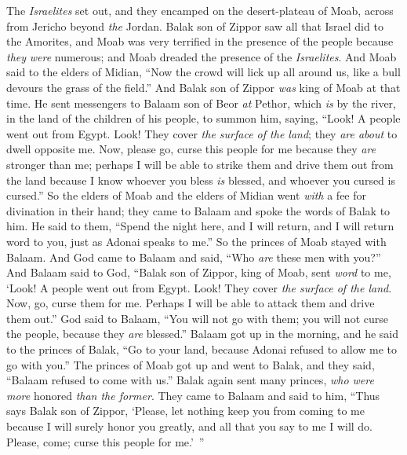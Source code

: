 \begin{biblechapter} %
 The \textit{Israelites} set out, and they encamped on the desert-plateau of Moab, across from Jericho beyond \textit{the} Jordan.
\verse Balak son of Zippor saw all that Israel did to the Amorites,
\verse and Moab was very terrified in the presence of the people because \textit{they} \textit{were} numerous; and Moab dreaded the presence of the \textit{Israelites}.
\verse And Moab said to the elders of Midian, “Now the crowd will lick up all around us, like a bull devours the grass of the field.” And Balak son of Zippor \textit{was} king of Moab at that time.
\verse He sent messengers to Balaam son of Beor \textit{at} Pethor, which \textit{is} by the river, in the land of the children of his people, to summon him, saying, “Look! A people went out from Egypt. Look! They cover \textit{the surface of the land}; they \textit{are about} to dwell opposite me.
\verse Now, please go, curse this people for me because they \textit{are} stronger than me; perhaps I will be able to strike them and drive them out from the land because I know whoever you bless \textit{is} blessed, and whoever you cursed is cursed.”
\verse So the elders of Moab and the elders of Midian went \textit{with} a fee for divination in their hand; they came to Balaam and spoke the words of Balak to him.
\verse He said to them, “Spend the night here, and I will return, and I will return word to you, just as Adonai speaks to me.” So the princes of Moab stayed with Balaam.
\verse And God came to Balaam and said, “Who \textit{are} these men with you?”
\verse And Balaam said to God, “Balak son of Zippor, king of Moab, sent \textit{word} to me,
\verse ‘Look! A people went out from Egypt. Look! They cover \textit{the surface of the land}. Now, go, curse them for me. Perhaps I will be able to attack them and drive them out.”
\verse God said to Balaam, “You will not go with them; you will not curse the people, because they \textit{are} blessed.”
\verse Balaam got up in the morning, and he said to the princes of Balak, “Go to your land, because Adonai refused to allow me to go with you.”
\verse The princes of Moab got up and went to Balak, and they said, “Balaam refused to come with us.”
\verse Balak again sent many princes, \textit{who were more} honored \textit{than the former}.
\verse They came to Balaam and said to him, “Thus says Balak son of Zippor, ‘Please, let nothing keep you from coming to me
\verse because I will surely honor you greatly, and all that you say to me I will do. Please, come; curse this people for me.’ ”

\end{biblechapter}
